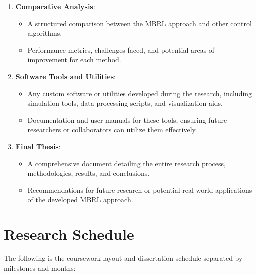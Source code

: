 \begin{enumerate}
    \item \textbf{Comparative Analysis}:
    \begin{itemize}
        \item A structured comparison between the MBRL approach and other control algorithms.
        \item Performance metrics, challenges faced, and potential areas of improvement for each method.
    \end{itemize}
    
    \item \textbf{Software Tools and Utilities}:
    \begin{itemize}
        \item Any custom software or utilities developed during the research, including simulation tools, data processing scripts, and visualization aids.
        \item Documentation and user manuals for these tools, ensuring future researchers or collaborators can utilize them effectively.
    \end{itemize}
    
    \item \textbf{Final Thesis}:
    \begin{itemize}
        \item A comprehensive document detailing the entire research process, methodologies, results, and conclusions.
        \item Recommendations for future research or potential real-world applications of the developed MBRL approach.
    \end{itemize}
\end{enumerate}

\section{Research Schedule}

The following is the coursework layout and dissertation schedule separated by milestones and months:

